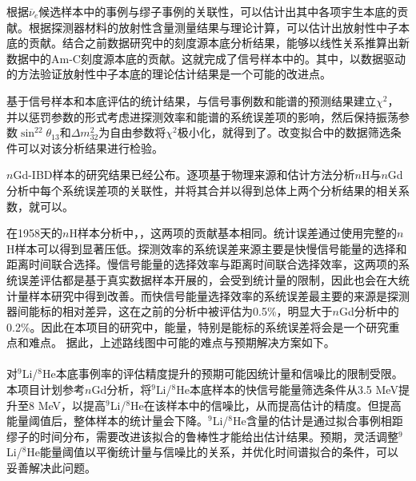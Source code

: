\documentclass[a4paper,zihao=-4]{article}
\begin{document}
根据$\overline{\nu}_e$候选样本中的事例与缪子事例的关联性，可以估计出其中各项宇生本底的贡献。根据探测器材料的放射性含量测量结果与理论计算，可以估计出放射性中子本底的贡献。结合之前数据研究中的刻度源本底分析结果，能够以线性关系推算出新数据中的Am-C刻度源本底的贡献。这就完成了信号样本中的。其中，以数据驱动的方法验证放射性中子本底的理论估计结果是一个可能的改进点。

基于信号样本和本底评估的统计结果，与信号事例数和能谱的预测结果建立$\chi^2$，并以惩罚参数的形式考虑进探测效率和能谱的系统误差项的影响，然后保持振荡参数$\sin^22\theta_{13}$和$\Delta m_{32}^2$为自由参数将$\chi^2$极小化，就得到了。改变拟合中的数据筛选条件可以对该分析结果进行检验。

$n$Gd-IBD样本的研究结果已经公布。逐项基于物理来源和估计方法分析$n$H与$n$Gd分析中每个系统误差项的关联性，并将其合并以得到总体上两个分析结果的相关系数，就可以。

在1958天的$n$H样本分析中，，这两项的贡献基本相同。统计误差通过使用完整的$n$H样本可以得到显著压低。探测效率的系统误差来源主要是快慢信号能量的选择和距离时间联合选择。慢信号能量的选择效率与距离时间联合选择效率，这两项的系统误差评估都是基于真实数据样本开展的，会受到统计量的限制，因此也会在大统计量样本研究中得到改善。而快信号能量选择效率的系统误差最主要的来源是探测器间能标的相对差异，这在之前的分析中被评估为0.5\%，明显大于$n$Gd分析中的0.2\%。因此在本项目的研究中，能量，特别是能标的系统误差将会是一个研究重点和难点。
据此，上述路线图中可能的难点与预期解决方案如下。
\paragraph{}对$^9$Li/$^8$He本底事例率的评估精度提升的预期可能因统计量和信噪比的限制受限。本项目计划参考$n$Gd分析，将$^9$Li/$^8$He本底样本的快信号能量筛选条件从3.5 MeV提升至8 MeV，以提高$^9$Li/$^8$He在该样本中的信噪比，从而提高估计的精度。但提高能量阈值后，整体样本的统计量会下降。$^9$Li/$^8$He含量的估计是通过拟合事例相距缪子的时间分布，需要改进该拟合的鲁棒性才能给出估计结果。预期，灵活调整$^9$Li/$^8$He能量阈值以平衡统计量与信噪比的关系，并优化时间谱拟合的条件，可以妥善解决此问题。
\end{document}
